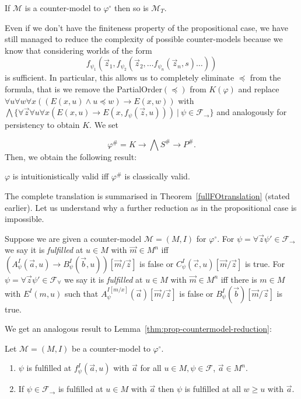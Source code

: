 \documentclass[a4paper,UKenglish,cleveref, autoref, thm-restate]{lipics-v2021}
\begin{document}
\begin{lemma}
	If $\mathcal M$ is a counter-model to $\varphi^\circ$ then so is $\mathcal M_T$.
\end{lemma}

Even if we don't have the finiteness property of the propositional case, we have still managed to reduce the complexity of possible counter-models because we know that considering worlds of the form $$f_{\psi_1}(\vec z_1, f_{\psi_2}(\vec z_2, \dots f_{\psi_n}(\vec z_n, s)\dots))$$ is sufficient.
In particular, this allows us to completely eliminate $\preceq$ from the formula, that is we remove the PartialOrder$(\preceq)$
from $K(\varphi)$ and replace $\forall u\forall w\forall x((E(x, u)\wedge u\preceq w)\to E(x, w))$ with $\bigwedge\{\forall \vec z\forall u\forall x(E(x, u)\to E(x, f_\psi(\vec z, u)))\:|\:\psi\in\mathcal F_\to\}$ and analogously for persistency to obtain $K$. We set

$$\varphi^{\#} = K\to \bigwedge S^\#\to P^\#.$$
Then, we obtain the following result:
\begin{theorem}
	\label{thm:fo-reduction}
	$\varphi$ is intuitionistically valid iff $\varphi^\#$ is classically valid.
\end{theorem}
The complete translation is summarised in Theorem~\ref{fullFOtranslation} (stated earlier). Let us understand why a further reduction as in the propositional case is impossible.


\begin{definition}
\label{def:fo-fulfilled}
	Suppose we are given a counter-model $\mathcal M = (M, I)$ for $\varphi^\circ$. For $\psi = \forall\vec z\psi'\in\mathcal F_\to$ we say it is \emph{fulfilled} at $u\in M$ with $\vec m\in M^n$ iff $(A_\psi^I(\vec a, u)\to B_\psi^I(\vec b, u))[\vec m/\vec z]$ is false or $C_\psi^I(\vec c, u)[\vec m/\vec z]$ is true.
	For $\psi = \forall\vec z\psi'\in\mathcal F_\forall$ we say it is \emph{fulfilled} at $u\in M$ with $\vec m\in M^n$ iff there is $m\in M$ with $E^{I}(m, u)$ such that $A^{I[m/x]}_\psi(\vec a)[\vec m/\vec z]$ is false or $B_\psi^I(\vec b)[\vec m/\vec z]$ is true.
\end{definition}

We get an analogous result to Lemma~\ref{thm:prop-countermodel-reduction}:

\begin{lemma}
\label{thm:fo-countermodel-reduction}
	Let $\mathcal M = (M, I)$ be a counter-model to $\mathcal \varphi^\circ$.
	\begin{enumerate}
		\item $\psi$ is fulfilled at $f_\psi^I(\vec a, u)$ with $\vec a$ for all $u\in M, \psi\in\mathcal F$, $\vec a\in M^n$.
		\item If $\psi\in\mathcal F_\to$ is fulfilled at $u\in M$ with $\vec a$ then $\psi$ is fulfilled at all $w\geq u$ with $\vec a$.
	\end{enumerate}	
\end{lemma}
\end{document}
